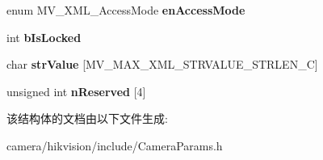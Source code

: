 \begin{DoxyCompactItemize}
\mbox{\label{struct___m_v___x_m_l___f_e_a_t_u_r_e___string___a0166cb764062df31ffc2a3c65d9f18f4}} 
enum M\+V\+\_\+\+X\+M\+L\+\_\+\+Access\+Mode {\bfseries en\+Access\+Mode}
\item 
\mbox{\label{struct___m_v___x_m_l___f_e_a_t_u_r_e___string___a5f2569885e2c006d0b41d407b76899b2}} 
int {\bfseries b\+Is\+Locked}
\item 
\mbox{\label{struct___m_v___x_m_l___f_e_a_t_u_r_e___string___a1771374fd47e493b07ca40f8506823f4}} 
char {\bfseries str\+Value} \mbox{[}M\+V\+\_\+\+M\+A\+X\+\_\+\+X\+M\+L\+\_\+\+S\+T\+R\+V\+A\+L\+U\+E\+\_\+\+S\+T\+R\+L\+E\+N\+\_\+C\mbox{]}
\item 
\mbox{\label{struct___m_v___x_m_l___f_e_a_t_u_r_e___string___aa6abfaebdd3de5325e76e562e6c6dccf}} 
unsigned int {\bfseries n\+Reserved} \mbox{[}4\mbox{]}
\end{DoxyCompactItemize}


该结构体的文档由以下文件生成\+:\begin{DoxyCompactItemize}
\item 
camera/hikvision/include/Camera\+Params.\+h\end{DoxyCompactItemize}
